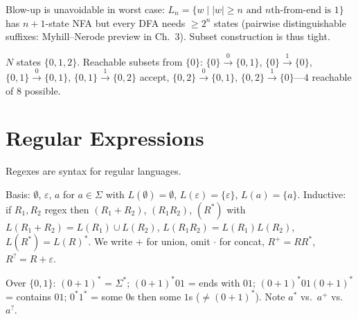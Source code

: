 Blow-up is unavoidable in worst case: $L_n=\{w\mid |w|\ge n\text{ and $n$th-from-end is }1\}$ has $n+1$-state NFA but every DFA needs $\ge2^n$ states (pairwise distinguishable suffixes: Myhill--Nerode preview in Ch.~3). Subset construction is thus tight.

\begin{example}
$N$ states $\{0,1,2\}$. Reachable subsets from $\{0\}$: $\{0\}\xrightarrow{0}\{0,1\}$, $\{0\}\xrightarrow{1}\{0\}$, $\{0,1\}\xrightarrow{0}\{0,1\}$, $\{0,1\}\xrightarrow{1}\{0,2\}$ accept, $\{0,2\}\xrightarrow{0}\{0,1\}$, $\{0,2\}\xrightarrow{1}\{0\}$---$4$ reachable of $8$ possible.
\end{example}

\section{Regular Expressions}
\label{sec:regex}
Regexes are syntax for regular languages.

\begin{definition}
Basis: $\emptyset$, $\varepsilon$, $a$ for $a\in\Sigma$ with $L(\emptyset)=\emptyset$, $L(\varepsilon)=\{\varepsilon\}$, $L(a)=\{a\}$. Inductive: if $R_1,R_2$ regex then $(R_1+R_2)$, $(R_1R_2)$, $(R^*)$ with $L(R_1+R_2)=L(R_1)\cup L(R_2)$, $L(R_1R_2)=L(R_1)L(R_2)$, $L(R^*)=L(R)^*$. We write $+$ for union, omit $\cdot$ for concat, $R^+=RR^*$, $R^?=R+\varepsilon$.
\end{definition}

\begin{example}
Over $\{0,1\}$: $(0+1)^*$ = $\Sigma^*$; $(0+1)^*01$ = ends with $01$; $(0+1)^*01(0+1)^*$ = contains $01$; $0^*1^*$ = some $0$s then some $1$s ($\neq(0+1)^*$). Note $a^*$ vs.\ $a^+$ vs.\ $a^?$.
\end{example}


